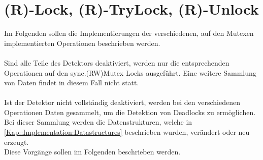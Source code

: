 \section{(R)-Lock, (R)-TryLock, (R)-Unlock}
Im Folgenden sollen die Implementierungen der verschiedenen, auf den Mutexen
implementierten Operationen beschrieben werden.\\\\ 
Sind alle Teile des Detektors deaktiviert, werden nur die entsprechenden 
Operationen auf den sync.(RW)Mutex Locks ausgeführt. Eine weitere Sammlung von Daten
findet in diesem Fall nicht statt.\\\\
Ist der Detektor nicht vollständig deaktiviert, werden bei den verschiedenen 
Operationen Daten gesammelt, um die Detektion von Deadlocks zu ermöglichen.  
Bei dieser Sammlung werden die Datenstrukturen,
welche in \ref{Kap::Implementation:Datastructures} beschrieben wurden, verändert
oder neu erzeugt.\\
Diese Vorgänge sollen im Folgenden beschrieben werden.
